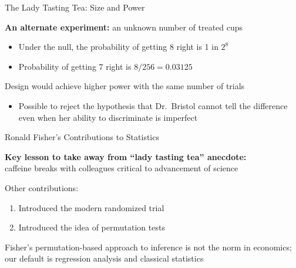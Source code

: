 \documentclass[10pt,xcolor=table,ignorenonframetext,handout,aspectratio=169]{beamer}
\newlength{\wideitemsep}
\let\olditem\item
\renewcommand{\item}{\setlength{\itemsep}{\wideitemsep}\olditem}
\begin{document}
\begin{frame}{The Lady Tasting Tea:  Size and Power}

\medskip
\textbf{An alternate experiment:} an unknown number of treated cups

\medskip
\begin{itemize}
	
	\item Under the null, the probability of getting 8 right is 1 in $2^8$
	
	\item Probability of getting 7 right is $8/256 = 0.03125$
	
\end{itemize}

\pause
\medskip
Design would achieve higher power with the same number of trials

\medskip
\begin{itemize}
	
	\item Possible to reject the hypothesis that Dr.~Bristol cannot tell the difference even when her ability to discriminate is imperfect
	
\end{itemize}


\end{frame}



\begin{frame}{Ronald Fisher's Contributions to Statistics}

\medskip
\textbf{Key lesson to take away from ``lady tasting tea'' anecdote:}  \\
caffeine breaks with colleagues critical to advancement of science

\pause
\medskip
\medskip
Other contributions:

\medskip
\begin{enumerate}
	
	\item Introduced the modern randomized trial
	
	\item Introduced the idea of permutation tests
	
\end{enumerate}

\medskip
Fisher's permutation-based approach to inference is not the norm in economics; our default is regression analysis and classical statistics

\end{frame}
\end{document}
